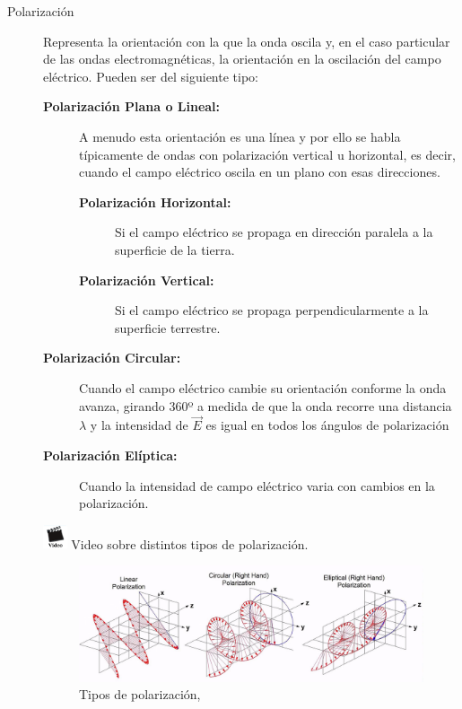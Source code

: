 \begin{description}
\item [Polarizaci\'on] Representa la orientaci\'on con la que la onda oscila y, en el caso particular de las ondas electromagn\'eticas, la orientaci\'on en la oscilaci\'on del campo el\'ectrico. 
Pueden ser del siguiente tipo:

\begin{description}
\item[\bf Polarizaci\'on Plana o Lineal:] A menudo esta orientaci\'on es una l\'inea y por ello se habla t\'ipicamente de ondas con polarizaci\'on vertical u horizontal, es decir, cuando el campo el\'ectrico oscila en un plano con esas direcciones.
  \begin{description}
  \item[\bf Polarizaci\'on Horizontal:] Si el campo eléctrico se propaga en dirección paralela a la superficie de la tierra.
  \item[\bf Polarizaci\'on Vertical:] Si el campo eléctrico se propaga perpendicularmente a la superficie terrestre.
  \end{description}

\item[\bf Polarizaci\'on Circular:] Cuando el campo el\'ectrico cambie su orientaci\'on conforme la onda avanza, girando 360º a medida de que la onda recorre una distancia $\lambda$ y la intensidad de $\vec{E}$ es igual en todos los \'angulos de polarizaci\'on

\item[\bf Polarizaci\'on El\'iptica:] Cuando la intensidad de campo eléctrico varia con cambios en la polarización.

\end{description}

\href{https://www.youtube.com/watch?v=Q0qrU4nprB0}{\includegraphics[width=20pt]{imagenes.iconos/video.jpg}} Video sobre distintos tipos de polarización.


\begin{figure}[!htb]
  \centering
    \includegraphics[width=\textwidth]{06.radionavegacion/Imagenes/06.00.ondas.electromagneticas/polarizacion_ondas_EM.jpg}    
    \caption{Tipos de polarizaci\'on, \protect\cite{PolarizacionImagenes}%
    }
  \label{fig:06.tipos.polarizacion}
\end{figure}



\end{description}

